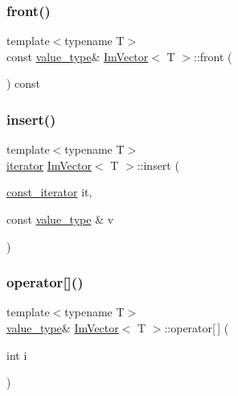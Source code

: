 \hypertarget{class_im_vector_a76dc6bb045574ba79b15a1941b662597}{}\label{class_im_vector_a76dc6bb045574ba79b15a1941b662597} 
\subsubsection{\texorpdfstring{front()}{front()}\hspace{0.1cm}{\footnotesize\ttfamily [2/2]}}
{\footnotesize\ttfamily template$<$typename T$>$ \\
const \hyperlink{class_im_vector_a8bd77e4e7581d8e5f9e98d7c2f3c2a80}{value\+\_\+type}\& \hyperlink{class_im_vector}{Im\+Vector}$<$ T $>$\+::front (\begin{DoxyParamCaption}{ }\end{DoxyParamCaption}) const}

\hypertarget{class_im_vector_a52fdb731c13c82a1fd971186c6a701b5}{}\label{class_im_vector_a52fdb731c13c82a1fd971186c6a701b5} 
\subsubsection{\texorpdfstring{insert()}{insert()}}
{\footnotesize\ttfamily template$<$typename T$>$ \\
\hyperlink{class_im_vector_a74b5478f1f6fd471cc71219bce483db6}{iterator} \hyperlink{class_im_vector}{Im\+Vector}$<$ T $>$\+::insert (\begin{DoxyParamCaption}\item[{\hyperlink{class_im_vector_aedeac9c5080f9d6ce96ae837768ee4c4}{const\+\_\+iterator}}]{it,  }\item[{const \hyperlink{class_im_vector_a8bd77e4e7581d8e5f9e98d7c2f3c2a80}{value\+\_\+type} \&}]{v }\end{DoxyParamCaption})}

\hypertarget{class_im_vector_a59a3eeadda07579727de93ca6844b91e}{}\label{class_im_vector_a59a3eeadda07579727de93ca6844b91e} 
\subsubsection{\texorpdfstring{operator[]()}{operator[]()}\hspace{0.1cm}{\footnotesize\ttfamily [1/2]}}
{\footnotesize\ttfamily template$<$typename T$>$ \\
\hyperlink{class_im_vector_a8bd77e4e7581d8e5f9e98d7c2f3c2a80}{value\+\_\+type}\& \hyperlink{class_im_vector}{Im\+Vector}$<$ T $>$\+::operator\mbox{[}$\,$\mbox{]} (\begin{DoxyParamCaption}\item[{int}]{i }\end{DoxyParamCaption})}

